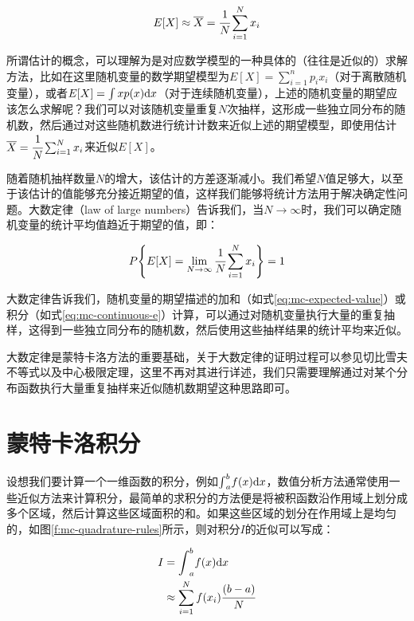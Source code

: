 \begin{equation}
	E[X]\approx\overline{X}=  \cfrac{1}{N}\sum_{i=1}^{N}x_i
\end{equation}

\begin{myshaded}
	所谓估计的概念，可以理解为是对应数学模型的一种具体的（往往是近似的）求解方法，比如在这里随机变量的数学期望模型为$E[X]=\sum^{n}_{i=1}p_ix_i$（对于离散随机变量），或者$E[X]=\int xp(x){\rm d}x$（对于连续随机变量），上述的随机变量的期望应该怎么求解呢？我们可以对该随机变量重复$N$次抽样，这形成一些独立同分布的随机数，然后通过对这些随机数进行统计计数来近似上述的期望模型，即使用估计$\overline{X}=  \cfrac{1}{N}\sum_{i=1}^{N}x_i$来近似$E[X]$。
\end{myshaded}

随着随机抽样数量$N$的增大，该估计的方差逐渐减小。我们希望$N$值足够大，以至于该估计的值能够充分接近期望的值，这样我们能够将统计方法用于解决确定性问题。大数定律（law of large numbers）告诉我们，当$N\rightarrow\infty$时，我们可以确定随机变量的统计平均值趋近于期望的值，即：

\begin{equation}\label{eq:mc-large-numbers}
	P\Bigg\{ E[X]=\lim_{N \to \infty} \cfrac{1}{N}\sum_{i=1}^{N}x_i \Bigg\}=1
\end{equation} 

大数定律告诉我们，随机变量的期望描述的加和（如式\ref{eq:mc-expected-value}）或积分（如式\ref{eq:mc-continuous-e}）计算，可以通过对随机变量执行大量的重复抽样，这得到一些独立同分布的随机数，然后使用这些抽样结果的统计平均来近似。

大数定律是蒙特卡洛方法的重要基础，关于大数定律的证明过程可以参见切比雪夫不等式以及中心极限定理，这里不再对其进行详述，我们只需要理解通过对某个分布函数执行大量重复抽样来近似随机数期望这种思路即可。




\section{蒙特卡洛积分}
设想我们要计算一个一维函数的积分，例如${\rm \int}_a^{b}f(x){\rm d}x$，数值分析方法通常使用一些近似方法来计算积分，最简单的求积分的方法便是将被积函数沿作用域上划分成多个区域，然后计算这些区域面积的和。如果这些区域的划分在作用域上是均匀的，如图\ref{f:mc-quadrature-rules}所示，则对积分$I$的近似可以写成：

\begin{equation}\label{eq:mc-quadrature-rules}
	\begin{aligned}
		I&={\rm \int}_{a}^{b}f(x){\rm d}x \\
		&\approx \sum_{i=1}^{N}f(x_i) \cfrac{(b-a)}{N}
	\end{aligned}
\end{equation}

